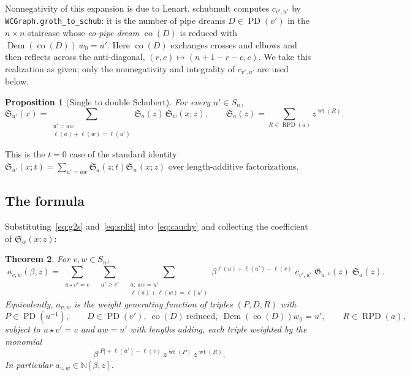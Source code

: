 \documentclass[11pt]{article}
\newtheorem{theorem}{Theorem}[section]
\newtheorem{proposition}[theorem]{Proposition}
\theoremstyle{definition}
\theoremstyle{remark}
\newcommand{\Sch}{\mathfrak{S}}
\newcommand{\Groth}{\mathfrak{G}}
\newcommand{\PD}{\operatorname{PD}}
\newcommand{\RPD}{\operatorname{RPD}}
\newcommand{\Dem}{\operatorname{Dem}}
\newcommand{\co}{\operatorname{co}}
\newcommand{\NN}{\mathbb{N}}
\newcommand{\wt}{\operatorname{wt}}
\newcommand{\dem}{\star}
\begin{document}
\begin{sloppypar}
Nonnegativity of this expansion is due to Lenart.  \textsf{schubmult}
computes $c_{v',u'}$ by \texttt{WCGraph.groth\_to\_schub}: it is the number
of pipe dreams $D\in\PD(v')$ in the $n\times n$ staircase whose
\emph{co-pipe-dream} $\co(D)$ is reduced with $\Dem(\co(D))\,w_0=u'$.
Here $\co(D)$ exchanges crosses and elbows and then reflects across the
anti-diagonal, $(r,c)\mapsto(n+1-r-c,c)$.  We take this realization as
given; only the nonnegativity and integrality of $c_{v',u'}$ are used below.
\end{sloppypar}

\begin{proposition}[Single to double Schubert]
\label{prop:split}
For every $u'\in S_n$,
\begin{equation}\label{eq:split}
 \Sch_{u'}(x)=\sum_{\substack{u'=aw\\\ell(a)+\ell(w)=\ell(u')}}
   \Sch_a(z)\,\Sch_w(x;z),
 \qquad
 \Sch_a(z)=\sum_{R\in\RPD(a)}z^{\wt(R)}.
\end{equation}
\end{proposition}

This is the $t=0$ case of the standard identity
$\Sch_{u'}(x;t)=\sum_{u'=aw}\Sch_a(z;t)\Sch_w(x;z)$ over length-additive
factorizations.

\subsection{The formula}

Substituting~\eqref{eq:g2s} and~\eqref{eq:split} into~\eqref{eq:cauchy}
and collecting the coefficient of $\Sch_w(x;z)$:

\begin{theorem}\label{thm:main}
For $v,w\in S_n$,
\begin{equation}\label{eq:main}
 \boxed{\;
 a_{v,w}(\beta,z)=
 \sum_{\substack{u\dem v'=v}}\ \
 \sum_{\substack{u'\ge v'}}\ \
 \sum_{\substack{a:\ aw=u'\\\ell(a)+\ell(w)=\ell(u')}}
 \beta^{\ell(u)+\ell(u')-\ell(v)}\;
 c_{v',u'}\;\Groth_{u^{-1}}(z)\;\Sch_a(z).
 \;}
\end{equation}
Equivalently, $a_{v,w}$ is the weight generating function of triples
$(P,D,R)$ with
\[
 P\in\PD(u^{-1}),\qquad
 D\in\PD(v'),\ \co(D)\ \text{reduced},\ \Dem(\co(D))w_0=u',\qquad
 R\in\RPD(a),
\]
subject to $u\dem v'=v$ and $aw=u'$ with lengths adding, each triple
weighted by the monomial
\[
 \beta^{|P|+\ell(u')-\ell(v)}\,z^{\wt(P)}\,z^{\wt(R)}.
\]
In particular $a_{v,w}\in\NN[\beta,z]$.
\end{theorem}
\end{document}
